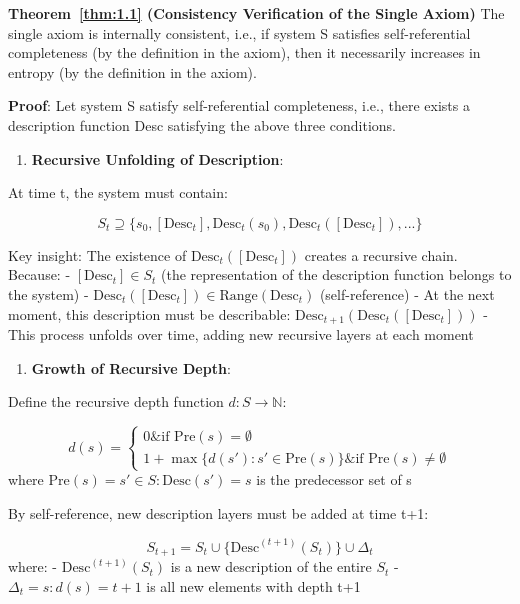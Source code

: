 
\textbf{Theorem~\ref{thm:1.1} (Consistency Verification of the Single Axiom)}
\label{thm:1.1}
The single axiom is internally consistent, i.e., if system S satisfies self-referential completeness (by the definition in the axiom), then it necessarily increases in entropy (by the definition in the axiom).

\textbf{Proof}:
Let system S satisfy self-referential completeness, i.e., there exists a description function Desc satisfying the above three conditions.

\begin{enumerate}
\item \textbf{Recursive Unfolding of Description}:
\end{enumerate}
   At time t, the system must contain:
   
\begin{equation}
S_t \supseteq \{s_0, [\text{Desc}_t], \text{Desc}_t(s_0), \text{Desc}_t([\text{Desc}_t]), ...\}
\end{equation}

   Key insight: The existence of $\text{Desc}_t([\text{Desc}_t])$ creates a recursive chain. Because:
   - $[\text{Desc}_t] \in S_t$ (the representation of the description function belongs to the system)
   - $\text{Desc}_t([\text{Desc}_t]) \in \text{Range}(\text{Desc}_t)$ (self-reference)
   - At the next moment, this description must be describable: $\text{Desc}_{t+1}(\text{Desc}_t([\text{Desc}_t]))$
   - This process unfolds over time, adding new recursive layers at each moment

\begin{enumerate}
\item \textbf{Growth of Recursive Depth}:
\end{enumerate}
   Define the recursive depth function $d: S \to \mathbb{N}$:
   
\begin{equation}
d(s) = \begin{cases}
0 \& \text{if } \text{Pre}(s) = \emptyset \\
1 + \max\{d(s'): s' \in \text{Pre}(s)\} \& \text{if } \text{Pre}(s) \neq \emptyset
\end{cases}
\end{equation}
   where $\text{Pre}(s) = {s' \in S: \text{Desc}(s') = s}$ is the predecessor set of s
   
   By self-reference, new description layers must be added at time t+1:
   
\begin{equation}
S_{t+1} = S_t \cup \{\text{Desc}^{(t+1)}(S_t)\} \cup \Delta_t
\end{equation}
   where:
   - $\text{Desc}^{(t+1)}(S_t)$ is a new description of the entire $S_t$
   - $\Delta_t = {s: d(s) = t+1}$ is all new elements with depth t+1
   
